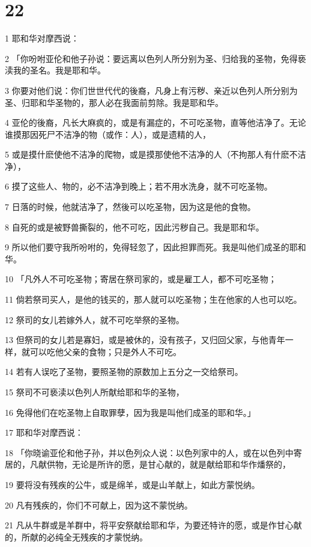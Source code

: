 \chapter{22}

\par 1 耶和华对摩西说：
\par 2 「你吩咐亚伦和他子孙说：要远离以色列人所分别为圣、归给我的圣物，免得亵渎我的圣名。我是耶和华。
\par 3 你要对他们说：你们世世代代的後裔，凡身上有污秽、亲近以色列人所分别为圣、归耶和华圣物的，那人必在我面前剪除。我是耶和华。
\par 4 亚伦的後裔，凡长大麻疯的，或是有漏症的，不可吃圣物，直等他洁净了。无论谁摸那因死尸不洁净的物（或作：人），或是遗精的人，
\par 5 或是摸什麽使他不洁净的爬物，或是摸那使他不洁净的人（不拘那人有什麽不洁净），
\par 6 摸了这些人、物的，必不洁净到晚上；若不用水洗身，就不可吃圣物。
\par 7 日落的时候，他就洁净了，然後可以吃圣物，因为这是他的食物。
\par 8 自死的或是被野兽撕裂的，他不可吃，因此污秽自己。我是耶和华。
\par 9 所以他们要守我所吩咐的，免得轻忽了，因此担罪而死。我是叫他们成圣的耶和华。
\par 10 「凡外人不可吃圣物；寄居在祭司家的，或是雇工人，都不可吃圣物；
\par 11 倘若祭司买人，是他的钱买的，那人就可以吃圣物；生在他家的人也可以吃。
\par 12 祭司的女儿若嫁外人，就不可吃举祭的圣物。
\par 13 但祭司的女儿若是寡妇，或是被休的，没有孩子，又归回父家，与他青年一样，就可以吃他父亲的食物；只是外人不可吃。
\par 14 若有人误吃了圣物，要照圣物的原数加上五分之一交给祭司。
\par 15 祭司不可亵渎以色列人所献给耶和华的圣物，
\par 16 免得他们在吃圣物上自取罪孽，因为我是叫他们成圣的耶和华。」
\par 17 耶和华对摩西说：
\par 18 「你晓谕亚伦和他子孙，并以色列众人说：以色列家中的人，或在以色列中寄居的，凡献供物，无论是所许的愿，是甘心献的，就是献给耶和华作燔祭的，
\par 19 要将没有残疾的公牛，或是绵羊，或是山羊献上，如此方蒙悦纳。
\par 20 凡有残疾的，你们不可献上，因为这不蒙悦纳。
\par 21 凡从牛群或是羊群中，将平安祭献给耶和华，为要还特许的愿，或是作甘心献的，所献的必纯全无残疾的才蒙悦纳。
